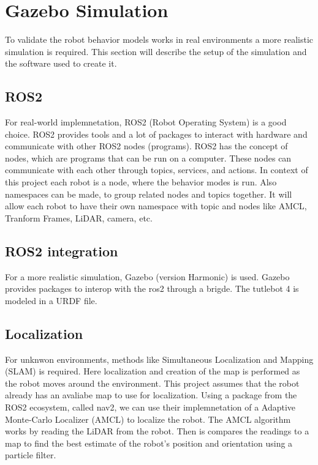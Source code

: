\section{Gazebo Simulation}
To validate the robot behavior models works in real environments a more realistic simulation is required.
This section will describe the setup of the simulation and the software used to create it.

\subsection{ROS2}\label{sub:ros_2}
For real-world implemnetation, ROS2 (Robot Operating System) is a good choice. ROS2 provides tools and a lot of packages to interact with hardware and communicate with other 
ROS2 nodes (programs).
ROS2 has the concept of nodes, which are programs that can be run on a computer. These nodes can communicate with each other through topics, services, and actions.
In context of this project each robot is a node, where the behavior modes is run. Also namespaces can be made, to group related nodes and topics together. 
It will allow each robot to have their own namespace with topic and nodes like AMCL, Tranform Frames, LiDAR, camera, etc.

\subsection{ROS2 integration}\label{sub:ros_integration}
For a more realistic simulation, Gazebo (version Harmonic) is used. Gazebo provides packages to interop with the ros2 through a brigde.
The tutlebot 4 is modeled in a URDF file.

\subsection{Localization}\label{sub:localization} 
For unknwon environments, methods like Simultaneous Localization and Mapping (SLAM) is required. Here localization and creation of the map is performed
as the robot moves around the environment.
This project assumes that the robot already has an avaliabe map to use for localization. 
Using a package from the ROS2 ecosystem, called nav2, we can use their implemnetation of a Adaptive Monte-Carlo Localizer (AMCL) to localize the robot.
The AMCL algorithm works by reading the LiDAR from the robot. Then is compares the readings to a map to find the best estimate of the robot's position and orientation using a particle filter.

